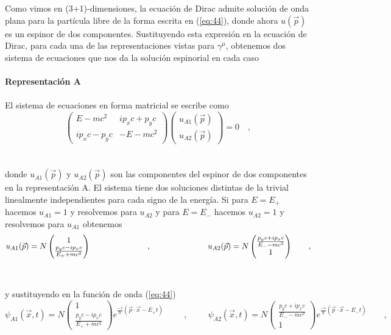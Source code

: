 \documentclass[11pt,letterpaper]{article}     %
\begin{document}
Como vimos en (3+1)-dimensiones, la ecuación de Dirac admite solución de onda plana para la partícula libre de la forma escrita en (\ref{eq:44}), donde ahora $u(\vec{p})$ es un espinor de dos componentes. Sustituyendo esta expresión en la ecuación de Dirac, para cada una de las representaciones vistas para $\gamma^\mu$, obtenemos dos sistema de ecuaciones que nos da la solución espinorial en cada caso \\ \\
\textbf{Representación A} \\ \\
El sistema de ecuaciones en forma matricial se escribe como \\
\begin{equation} \label{eq:120}
\begin{pmatrix}
E -mc^2 & ip_x c+p_yc \\ ip_xc-p_yc & -E -mc^2
\end{pmatrix} 
\begin{pmatrix}
u_{A1}(\vec{p}) \\ u_{A2}(\vec{p})
\end{pmatrix}=0 \quad ,
\end{equation} \\ \\
donde $u_{A1}(\vec{p})$ y $u_{A2}(\vec{p})$ son las componentes del espinor de dos componentes en la representación A. El sistema tiene dos soluciones distintas de la trivial linealmente independientes para cada signo de la energía. Si para $E=E_+$ hacemos $u_{A1}=1$ y resolvemos para $u_{A2}$ y para $E=E_-$ hacemos $u_{A2}=1$ y resolvemos para $u_{A1}$ obtenemos
\begin{equation} \label{eq:121}
u_{A1}(\vec{p})= N\begin{pmatrix}
1 \\ \frac{p_yc-ip_xc}{E_+ +mc^2}
\end{pmatrix} \hspace{2.5cm} , \hspace{2.5cm}
u_{A2} (\vec{p})= N\begin{pmatrix}
\frac{p_yc + i p_xc}{E_- -mc^2} \\ 1
\end{pmatrix} \qquad ,
\end{equation} \\ \\
y sustituyendo en la función de onda (\ref{eq:44}) \\ 
\begin{equation} \label{eq:122}
\psi_{A1} (\vec{x},t)=N 
\begin{pmatrix}
1 \\ \frac{p_yc-ip_xc}{E_+ +mc^2}
\end{pmatrix} e^{\frac{-i}{\hbar}(\vec{p}\cdot \vec{x} -E_+ t)} \hspace{1cm} , \hspace{1cm}
\psi_{A2} (\vec{x},t)= N
\begin{pmatrix}
\frac{p_yc+ip_xc}{E_- - mc^2} \\ 1
\end{pmatrix} e^{\frac{-i}{\hbar}(\vec{p}\cdot \vec{x} - E_- t)} \qquad ,
\end{equation} \\ \\
\end{document}

